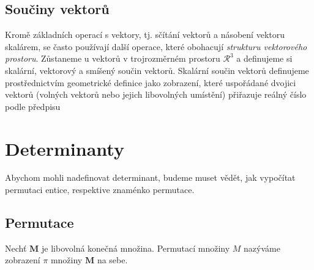 {    \subsection{Součiny vektorů}
      Kromě základních operací s vektory, tj. sčítání vektorů a násobení vektoru skalárem, se 
      často používají další operace, které obohacují \emph{strukturu vektorového prostoru}. 
      Zůstaneme u vektorů v trojrozměrném prostoru \(\mathcal{R}^3\) a definujeme si skalární, 
      vektorový a smíšený součin vektorů. Skalární součin vektorů definujeme prostřednictvím 
      geometrické definice jako zobrazení, které uspořádané dvojici vektorů (volných vektorů nebo 
      jejich libovolných umístění) přiřazuje reálný číslo podle předpisu
      
  \section{Determinanty}
    Abychom mohli nadefinovat determinant, budeme muset vědět, jak vypočítat permutaci entice, 
    respektive znaménko permutace.
    \subsection{Permutace}
      \begin{definition}\label{permutace}
        Nechť \(\mathbf{M}\) je libovolná konečná množina. Permutací množiny \(M\) nazýváme 
        zobrazení \(\pi\) množiny \(\mathbf{M}\) na sebe.
      \end{definition}
      
}

